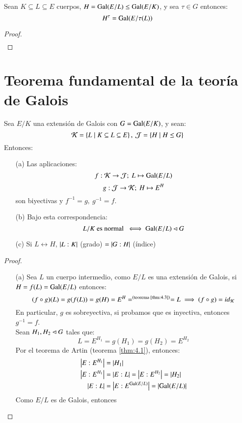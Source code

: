\begin{lm}[Lema]\label{lm:4.5} %
    Sean $K \subseteq L \subseteq E$ cuerpos, $H = \mathrm{Gal}(E/L) \leq \mathrm{Gal}(E/K)$, y sea $\tau \in G$ entonces:
    $$
        H^\tau = \mathrm{Gal}(E/\tau(L))
    $$
\end{lm}
\begin{proof}$ $
    \begin{align*}
    \end{align*}
\end{proof}

\section{Teorema fundamental de la teoría de Galois}
\begin{thm}\label{thm:fund-gal}\label{thm:4.6}
    Sea $E/K$ una extensión de Galois con $G = \mathrm{Gal}(E/K)$, y sean:
    $$
        \mathcal{K} = \left\{L \mid K \subseteq L \subseteq E\right\},\ \mathcal{J} = \left\{H \mid H \leq G\right\}
    $$
    Entonces:
    \begin{itemize}
        \item[(a)] Las aplicaciones:
        $$ f: \mathcal{K} \to \mathcal{J};\ L \mapsto \mathrm{Gal}(E/L)$$
        $$ g: \mtc{J} \to \mtc{K};\ H \mapsto E^H $$
        son biyectivas y $f^{-1} = g,\ g^{-1} = f$.
        \item[(b)] Bajo esta correspondencia:
        $$
            L/K \text{ es normal } \iff \mathrm{Gal}(E/L) \lhd G
        $$
        \item[(c)] Si $L \longleftrightarrow H$, $\left|L:K\right|$ (grado) $ = \left|G:H\right|$ (índice)
    \end{itemize}
\end{thm}
\begin{proof}$ $
    \begin{itemize}
        \item[(a)] Sea $L$ un cuerpo intermedio, como $E/L$ es una extensión de Galois, si $H = f(L) = \mathrm{Gal}(E/L)$ entonces:
        $$
            (f \circ g)(L) = g(f(L)) = g(H) = E^H =^{\text{(teorema \ref{thm:4.3})}} = L \implies (f \circ g) = id_{\mathcal{K}}
        $$
        En particular, $g$ es sobreyectiva, si probamos que es inyectiva, entonces $g^{-1} = f$.\\
        Sean $H_1, H_2 \lhd G$ tales que:
        $$
            L = E^{H_1} = g(H_1) = g(H_2) = E^{H_2}
        $$
        Por el teorema de Artin (teorema \ref{thm:4.1}), entonces:
        \begin{align*}
            \left|E:E^{H_1}\right| &= \left|H_1\right|\\
            \left|E:E^{H_1}\right| &= \left|E:L\right| = \left|E:E^{H_2}\right| = \left|H_2\right|\\
            \left|E:L\right| &= \left|E:E^{\mathrm{Gal}(E/L)}\right| = \left|\mathrm{Gal}(E/L)\right|
        \end{align*}
        Como $E/L$ es de Galois, entonces
    \end{itemize}
\end{proof}

